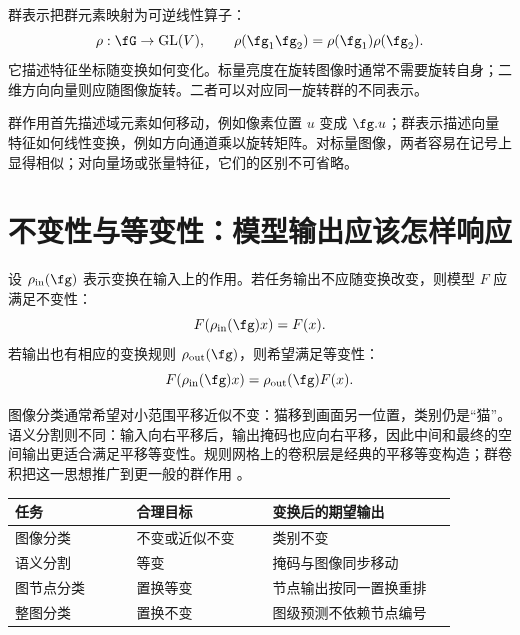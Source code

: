 群表示把群元素映射为可逆线性算子：
\begin{equation}
\rho:\fG\rightarrow\mathrm{GL}(V),
\qquad
\rho(\fg_1\fg_2)=\rho(\fg_1)\rho(\fg_2).
\label{app:primer:representation}
\end{equation}
它描述特征坐标随变换如何变化。标量亮度在旋转图像时通常不需要旋转自身；二维方向向量则应随图像旋转。二者可以对应同一旋转群的不同表示。

\begin{tcolorbox}[width=\linewidth,colback=boxgray!35,colframe=darkgry,title=常见误解：群作用不是群表示]
群作用首先描述域元素如何移动，例如像素位置 $u$ 变成 $\fg.u$；群表示描述向量特征如何线性变换，例如方向通道乘以旋转矩阵。对标量图像，两者容易在记号上显得相似；对向量场或张量特征，它们的区别不可省略。
\end{tcolorbox}

\section{不变性与等变性：模型输出应该怎样响应}
\label{app:primer:invariance-equivariance}

设 $\rho_{\mathrm{in}}(\fg)$ 表示变换在输入上的作用。若任务输出不应随变换改变，则模型 $F$ 应满足不变性：
\begin{equation}
F(\rho_{\mathrm{in}}(\fg)x)=F(x).
\label{app:primer:invariance}
\end{equation}
若输出也有相应的变换规则 $\rho_{\mathrm{out}}(\fg)$，则希望满足等变性：
\begin{equation}
F(\rho_{\mathrm{in}}(\fg)x)
=\rho_{\mathrm{out}}(\fg)F(x).
\label{app:primer:equivariance}
\end{equation}

图像分类通常希望对小范围平移近似不变：猫移到画面另一位置，类别仍是“猫”。语义分割则不同：输入向右平移后，输出掩码也应向右平移，因此中间和最终的空间输出更适合满足平移等变性。规则网格上的卷积层是经典的平移等变构造；群卷积把这一思想推广到更一般的群作用 \citep{cohen2016group}。

\begin{center}
\small
\begin{tabular}{@{}p{0.25\linewidth}p{0.28\linewidth}p{0.38\linewidth}@{}}
\toprule
任务 & 合理目标 & 变换后的期望输出 \\
\midrule
图像分类 & 不变或近似不变 & 类别不变 \\
语义分割 & 等变 & 掩码与图像同步移动 \\
图节点分类 & 置换等变 & 节点输出按同一置换重排 \\
整图分类 & 置换不变 & 图级预测不依赖节点编号 \\
\bottomrule
\end{tabular}
\end{center}

